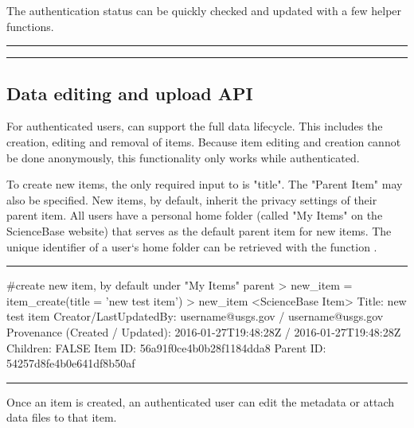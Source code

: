 The authentication status can be quickly checked and updated 
with a few helper functions.

\noindent\rule{\textwidth}{0.4pt}
\noindent\rule{\textwidth}{0.4pt}

\subsection{Data editing and upload API}
For authenticated users,  can support
the full data lifecycle. This includes the creation, editing and removal
of items. Because item editing and creation cannot be done anonymously,
this functionality only works while authenticated.

To create new items, the only required input to  is "title".
The "Parent Item" may also be specified. New items, by default, inherit the privacy 
settings of their parent item. All users have a personal home folder
(called "My Items" on the ScienceBase website) that serves as the default parent
item for new items. The unique identifier of a user`s home folder can be
retrieved with the function .

\noindent\rule{\textwidth}{0.4pt}
\begin{example}
#create new item, by default under "My Items" parent
> new_item = item_create(title = 'new test item')
> new_item
<ScienceBase Item>
  Title: new test item
  Creator/LastUpdatedBy:     username@usgs.gov / username@usgs.gov
  Provenance (Created / Updated):  2016-01-27T19:48:28Z / 2016-01-27T19:48:28Z
  Children: FALSE
  Item ID: 56a91f0ce4b0b28f1184dda8
  Parent ID: 54257d8fe4b0e641df8b50af
\end{example}
\noindent\rule{\textwidth}{0.4pt}

Once an item is created, an authenticated user can edit the metadata or attach
data files to that item.

